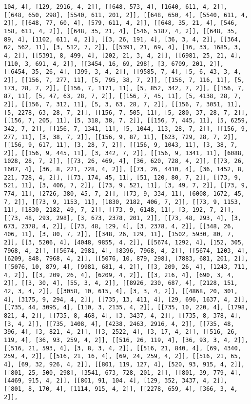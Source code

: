 \documentclass[12pt,fleqn]{article}\usepackage{../../common}
\begin{document}
\begin{verbatim}
104, 4], [129, 2916, 4, 2]], [[648, 573, 4], [1640, 611, 4, 2]], [[648, 650, 298], [5540, 611, 201, 2]], [[648, 650, 4], [5540, 611, 4, 2]], [[648, 77, 60, 4], [579, 611, 4, 2]], [[648, 35, 21, 4], [546, 158, 611, 4, 2]], [[648, 35, 21, 4], [546, 5187, 4, 2]], [[648, 35, 89, 4], [1102, 611, 4, 2]], [[3, 26, 191, 4], [36, 3, 4, 2]], [[364, 62, 562, 11], [3, 512, 7, 2]], [[5391, 21, 69, 4], [16, 33, 1685, 3, 4, 2]], [[5391, 8, 499, 4], [202, 21, 3, 4, 2]], [[6981, 25, 21, 4], [110, 3, 691, 4, 2]], [[3454, 16, 69, 298], [3, 6709, 201, 2]], [[6454, 35, 26, 4], [399, 3, 4, 2]], [[9585, 7, 4], [5, 6, 43, 3, 4, 2]], [[156, 7, 277, 11], [5, 795, 38, 7, 2]], [[156, 7, 116, 11], [5, 173, 28, 7, 2]], [[156, 7, 1171, 11], [5, 852, 342, 7, 2]], [[156, 7, 87, 11], [5, 47, 63, 28, 7, 2]], [[156, 7, 45, 11], [5, 4138, 28, 7, 2]], [[156, 7, 312, 11], [5, 3, 63, 28, 7, 2]], [[156, 7, 3051, 11], [5, 2278, 63, 28, 7, 2]], [[156, 7, 505, 11], [5, 280, 37, 28, 7, 2]], [[156, 7, 205, 11], [5, 318, 38, 7, 2]], [[156, 7, 445, 11], [5, 6259, 342, 7, 2]], [[156, 7, 1341, 11], [5, 1044, 113, 28, 7, 2]], [[156, 9, 277, 11], [3, 38, 7, 2]], [[156, 9, 87, 11], [623, 729, 28, 7, 2]], [[156, 9, 617, 11], [3, 28, 7, 2]], [[156, 9, 1043, 11], [3, 38, 7, 2]], [[156, 9, 445, 11], [3, 342, 7, 2]], [[156, 9, 1341, 11], [6088, 1028, 28, 7, 2]], [[73, 26, 469, 4], [36, 620, 728, 4, 2]], [[73, 26, 1607, 4], [36, 8, 221, 728, 4, 2]], [[73, 26, 4410, 4], [36, 1452, 8, 221, 728, 4, 2]], [[73, 174, 45, 11], [51, 120, 80, 7, 2]], [[73, 9, 521, 11], [3, 406, 7, 2]], [[73, 9, 521, 11], [3, 49, 7, 2]], [[73, 9, 774, 11], [2726, 380, 45, 7, 2]], [[73, 9, 334, 11], [6008, 1672, 45, 7, 2]], [[73, 9, 1153, 11], [1830, 2182, 406, 7, 2]], [[73, 9, 1153, 11], [1830, 2182, 49, 7, 2]], [[73, 9, 6148, 11], [3, 192, 7, 2]], [[73, 48, 293, 298], [3, 673, 2378, 201, 2]], [[73, 48, 293, 4], [3, 673, 2378, 4, 2]], [[73, 48, 129, 4], [3, 2378, 4, 2]], [[348, 26, 406, 11], [3, 80, 7, 2]], [[348, 26, 129, 11], [1502, 5930, 80, 7, 2]], [[3, 5206, 4], [4048, 9855, 4, 2]], [[5674, 1292, 4], [152, 305, 7968, 4, 2]], [[5674, 2981, 4], [8396, 7968, 4, 2]], [[5674, 1203, 4], [6209, 848, 7968, 4, 2]], [[5076, 10, 879, 298], [7883, 681, 201, 2]], [[5076, 10, 879, 4], [9981, 681, 4, 2]], [[3, 209, 26, 4], [1243, 711, 4, 2]], [[3, 209, 26, 4], [6209, 4, 2]], [[3, 216, 4], [690, 3, 4, 2]], [[3, 30, 4], [55, 3, 4, 2]], [[8926, 230, 687, 4], [2128, 151, 42, 3, 4, 2]], [[3058, 10, 615, 4], [3, 3, 4, 2]], [[4868, 20, 301, 4], [3175, 9, 294, 4, 2]], [[735, 13, 411, 4], [29, 696, 1637, 4, 2]], [[735, 44, 3095, 4], [110, 3, 2135, 4, 2]], [[735, 10, 220, 4], [1798, 821, 4, 2]], [[735, 8, 468, 4], [3, 3437, 4, 2]], [[735, 8, 378, 4], [3, 4, 2]], [[735, 1408, 4], [4238, 2463, 2916, 4, 2]], [[735, 48, 396, 4], [3, 821, 4, 2]], [[3, 2522, 4], [3, 17, 4, 2]], [[516, 26, 119, 4], [36, 93, 259, 4, 2]], [[516, 26, 119, 4], [36, 93, 3, 4, 2]], [[516, 21, 593, 4], [3, 8, 3, 4, 2]], [[516, 21, 840, 4], [69, 4340, 259, 4, 2]], [[516, 21, 16, 4], [69, 24, 259, 4, 2]], [[516, 21, 65, 4], [69, 32, 926, 4, 2]], [[801, 119, 127, 4], [520, 93, 915, 4, 2]], [[801, 25, 500, 298], [3541, 673, 728, 201, 2]], [[801, 39, 779, 4], [4469, 915, 4, 2]], [[801, 91, 104, 4], [129, 352, 3437, 4, 2]], [[801, 8, 170, 4], [1114, 915, 4, 2]], [[2278, 659, 4], [366, 3, 4, 2]], 
\end{verbatim}
\end{document}
